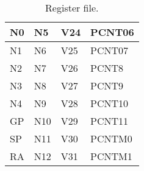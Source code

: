 \begin{table}[hbt!]
\begin{center}
\begin{tabular}{|l|l|l|l|}
        N0 & N5 & V24 & PCNT06 \\
        \hline
        N1 & N6 & V25 & PCNT07 \\
        \hline
        N2 & N7 & V26 & PCNT8 \\
        \hline
        N3 & N8 & V27 & PCNT9 \\
        \hline
        N4 & N9 & V28 & PCNT10 \\
        \hline
        GP & N10 & V29 & PCNT11 \\
        \hline
        SP & N11 & V30 & PCNTM0 \\
        \hline
        RA & N12 & V31 & PCNTM1 \\
        \hline

    \end{tabular}

    \caption[Register file]{Register file.}

    \end{center}
    
\end{table}